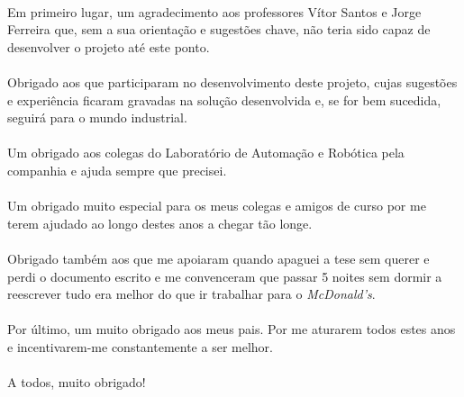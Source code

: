 \documentclass[11pt,twoside,a4paper]{report}
\begin{document}
\titlepage\ \endtitlepage                        %

\TitlePage
  \vspace*{55mm}
       {Em primeiro lugar, um agradecimento aos professores Vítor Santos e Jorge Ferreira que, sem a sua orientação e sugestões chave, não teria sido capaz de desenvolver o projeto até este ponto.\\
        \\
       Obrigado aos que participaram no desenvolvimento deste projeto, cujas sugestões e experiência ficaram gravadas na solução desenvolvida e, se for bem sucedida, seguirá para o mundo industrial.\\
        \\
       Um obrigado aos colegas do Laboratório de Automação e Robótica pela companhia e ajuda sempre que precisei.\\
        \\
       Um obrigado muito especial para os meus colegas e amigos de curso por me terem ajudado ao longo destes anos a chegar tão longe.\\
        \\
       Obrigado também aos que me apoiaram quando apaguei a tese sem querer e perdi o documento escrito e me convenceram que passar 5 noites sem dormir a reescrever tudo era melhor do que ir trabalhar para o \textit{McDonald's}.\\
        \\
       Por último, um muito obrigado aos meus pais. Por me aturarem todos estes anos e incentivarem-me constantemente a ser melhor.\\
        \\
       A todos, muito obrigado!}
  \TEXT{}
       {}
\EndTitlePage
\titlepage\ \endtitlepage %
\end{document}
